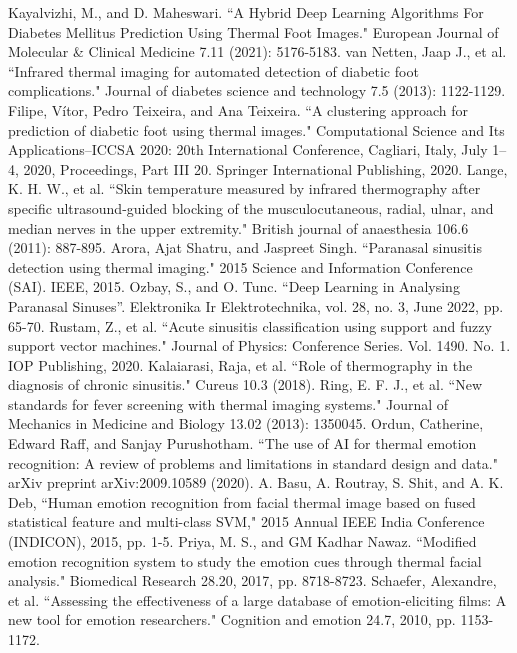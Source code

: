 \begin{thebibliography}{00}
 Kayalvizhi, M., and D. Maheswari. ``A Hybrid Deep Learning Algorithms For Diabetes Mellitus Prediction Using Thermal Foot Images." European Journal of Molecular \& Clinical Medicine 7.11 (2021): 5176-5183.
 van Netten, Jaap J., et al. ``Infrared thermal imaging for automated detection of diabetic foot complications." Journal of diabetes science and technology 7.5 (2013): 1122-1129.
 Filipe, Vítor, Pedro Teixeira, and Ana Teixeira. ``A clustering approach for prediction of diabetic foot using thermal images." Computational Science and Its Applications–ICCSA 2020: 20th International Conference, Cagliari, Italy, July 1–4, 2020, Proceedings, Part III 20. Springer International Publishing, 2020.
 Lange, K. H. W., et al. ``Skin temperature measured by infrared thermography after specific ultrasound-guided blocking of the musculocutaneous, radial, ulnar, and median nerves in the upper extremity." British journal of anaesthesia 106.6 (2011): 887-895.
 Arora, Ajat Shatru, and Jaspreet Singh. ``Paranasal sinusitis detection using thermal imaging." 2015 Science and Information Conference (SAI). IEEE, 2015.
 Ozbay, S., and O. Tunc. ``Deep Learning in Analysing Paranasal Sinuses”. Elektronika Ir Elektrotechnika, vol. 28, no. 3, June 2022, pp. 65-70.
 Rustam, Z., et al. ``Acute sinusitis classification using support and fuzzy support vector machines." Journal of Physics: Conference Series. Vol. 1490. No. 1. IOP Publishing, 2020.
 Kalaiarasi, Raja, et al. ``Role of thermography in the diagnosis of chronic sinusitis." Cureus 10.3 (2018).
 Ring, E. F. J., et al. ``New standards for fever screening with thermal imaging systems." Journal of Mechanics in Medicine and Biology 13.02 (2013): 1350045.
 Ordun, Catherine, Edward Raff, and Sanjay Purushotham. ``The use of AI for thermal emotion recognition: A review of problems and limitations in standard design and data." arXiv preprint arXiv:2009.10589 (2020).
 A. Basu, A. Routray, S. Shit, and A. K. Deb, ``Human emotion recognition from facial thermal image based on fused statistical feature and multi-class SVM," 2015 Annual IEEE India Conference (INDICON), 2015, pp. 1-5.
 Priya, M. S., and GM Kadhar Nawaz. ``Modified emotion recognition system to study the emotion cues through thermal facial analysis." Biomedical Research 28.20, 2017, pp. 8718-8723.
 Schaefer, Alexandre, et al. ``Assessing the effectiveness of a large database of emotion-eliciting films: A new tool for emotion researchers." Cognition and emotion 24.7, 2010, pp. 1153-1172.

\end{thebibliography}
